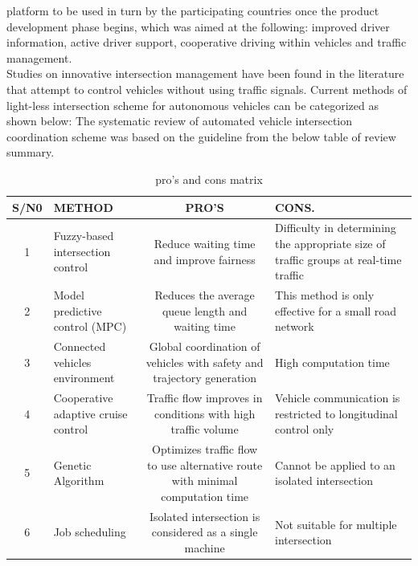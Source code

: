 \documentclass{book}
\begin{document}
platform to be used in turn by the participating countries once the product development phase begins, which was aimed at the following: improved driver information, active driver support,  cooperative driving within vehicles and traffic management\cite{barfield2014human}. \\
Studies on innovative intersection management have been found in the literature that attempt to control vehicles without using traffic signals. Current methods of light-less intersection scheme for autonomous vehicles can be categorized as shown below: The systematic review of automated vehicle intersection coordination scheme was based  on the guideline from the below table of review summary.

\begin{table}
\caption{pro's and cons matrix}
\begin{tabular}{|c|l|c|l|}\hline
S/N0 & METHOD & PRO'S & CONS. \\\hline
1 & \multicolumn{1}{m{3cm}|}{Fuzzy-based intersection control} & \multicolumn{1}{m{4cm}|}{Reduce waiting time and improve fairness} & \multicolumn{1}{m{4cm}|}{Difficulty in determining the appropriate size of traffic groups at real-time traffic} \\\hline
  2 & \multicolumn{1}{m{3cm}|}{Model predictive control (MPC)} & \multicolumn{1}{m{4cm}|}{Reduces the average queue length and waiting time} & \multicolumn{1}{m{4cm}|}{This method is only effective for a small road network} \\\hline
  3 & \multicolumn{1}{m{3cm}|}{Connected vehicles environment} & \multicolumn{1}{m{4cm}|}{Global coordination of vehicles with safety and trajectory generation } & \multicolumn{1}{m{4cm}|}{High computation time}\\\hline
  4 & \multicolumn{1}{m{3cm}|}{Cooperative adaptive cruise control} & \multicolumn{1}{m{4cm}|}{Traffic flow improves in conditions with high traffic volume} & \multicolumn{1}{m{4cm}|}{Vehicle communication is restricted to longitudinal control only}\\\hline
  5 & \multicolumn{1}{m{3cm}|}{Genetic Algorithm} & \multicolumn{1}{m{4cm}|}{Optimizes traffic flow to use alternative route with minimal computation time} & \multicolumn{1}{m{4cm}|}{Cannot be applied to an isolated intersection}\\\hline
  6 & \multicolumn{1}{m{3cm}|}{ Job scheduling} & \multicolumn{1}{m{4cm}|}{Isolated intersection is considered as a single machine} & \multicolumn{1}{m{4cm}|}{Not suitable for multiple intersection}\\\hline

\end{tabular}
\end{table}
\end{document}

